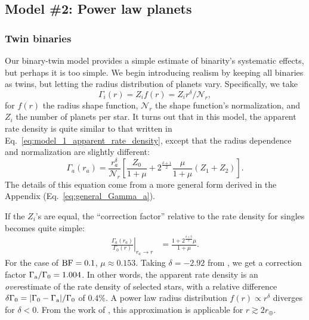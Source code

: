\documentclass[12pt,modern]{aastex61}
\renewcommand{\a}{_{\rm a}}
\begin{document}
\subsection{Model \#2: Power law planets}
\label{sec:model_2}

\subsubsection{Twin binaries}
Our binary-twin model provides a simple estimate of binarity's systematic 
effects, but perhaps it is too simple.
We begin introducing realism by keeping all binaries as twins, but letting the 
radius distribution of planets vary.
Specifically, we take
\begin{equation}
\Gamma_i(r) = Z_i f(r) = Z_i r^\delta/\mathcal{N}_r,
\end{equation}
for $f(r)$ the radius shape function, $\mathcal{N}_r$ the shape function's 
normalization, and $Z_i$ the number of planets per star.
It turns out that in this model, the apparent rate density is quite similar to 
that written in Eq.~\ref{eq:model_1_apparent_rate_density}, except that the 
radius dependence and normalization are slightly different:
\begin{equation}
\Gamma_a(r_a) = \frac{r_a^\delta}{\mathcal{N}_r} \left[
\frac{Z_0}{1+\mu}
+
2^{\frac{\delta+1}{2} } \frac{\mu}{1+\mu} \left(Z_1 + Z_2
\right)
\right].
\label{eq:model5_apparent_rate_density}
\end{equation}
The details of this equation come from a more general form derived in the 
Appendix (Eq.~\ref{eq:general_Gamma_a}).

If the $Z_i$'s are equal, the ``correction factor'' relative to the rate 
density for singles becomes quite simple:
\begin{align}
\left. \frac{\Gamma_a(r_a)}{\Gamma_0(r)} 
\right|_{r_a\rightarrow r}
&=
\frac{1 + 2^{\frac{\delta+3}{2}}\mu}{1 + \mu}.
\label{eq:power_law_correction}
\end{align}
For the case of ${\rm BF}=0.1$, $\mu\approx 0.153$. Taking $\delta=-2.92$ from 
\citet{howard_planet_2012},  we get a correction factor $\Gamma\a/\Gamma_0 = 
1.004$.
In other words, the apparent rate density is an {\it over}estimate of the rate 
density of selected stars, with a relative difference $\delta \Gamma_0 = 
|\Gamma_0 - \Gamma\a | / \Gamma_0$ of 0.4\%.
A power law radius distribution $f(r) \propto r^\delta$ diverges for 
$\delta < 0$. From the work of \citet{howard_planet_2012}, this approximation 
is applicable for $r\gtrsim 2r_\oplus$.
\end{document}
